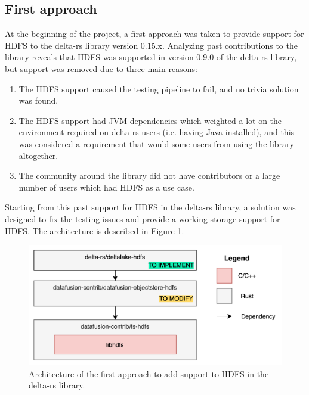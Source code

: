 \subsection{First approach}
At the beginning of the project, a first approach was taken to provide support for \gls{HDFS} to the delta-rs library version 0.15.x. Analyzing past contributions to the library reveals that \gls{HDFS} was supported in version 0.9.0 of the delta-rs library, but support was removed due to three main reasons:
\begin{enumerate}
  \item The \gls{HDFS} support caused the testing pipeline to fail, and no trivia solution was found.
  \item The \gls{HDFS} support had \gls{JVM} dependencies which weighted a lot on the environment required on delta-rs users (i.e. having Java installed), and this was considered a requirement that would some users from using the library altogether.
  \item The community around the library did not have contributors or a large number of users which had \gls{HDFS} as a use case.
\end{enumerate}
Starting from this past support for \gls{HDFS} in the delta-rs library, a solution was designed to fix the testing issues and provide a working storage support for \gls{HDFS}. The architecture is described in Figure \ref{fig:approach_1_solution_schema}. 

\begin{figure}[!ht]
  \begin{center}
    \includegraphics[width=\textwidth]{figures/4-implementation/approach1_solution_schema.png}
  \caption{Architecture of the first approach to add support to \gls{HDFS} in the delta-rs library.}
  \label{fig:approach_1_solution_schema}
  \end{center}
\end{figure}

